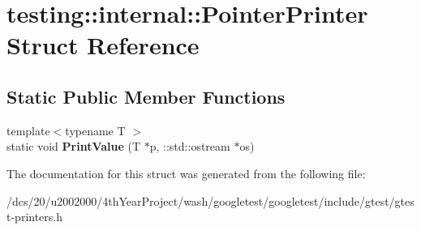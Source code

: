 \hypertarget{structtesting_1_1internal_1_1PointerPrinter}{}\section{testing\+:\+:internal\+:\+:Pointer\+Printer Struct Reference}
\label{structtesting_1_1internal_1_1PointerPrinter}
\subsection*{Static Public Member Functions}
\begin{DoxyCompactItemize}
\item 
\mbox{\label{structtesting_1_1internal_1_1PointerPrinter_a4383fca99549077ffd4e8aa7a1657fa3}} 
{\footnotesize template$<$typename T $>$ }\\static void {\bfseries Print\+Value} (T $\ast$p, \+::std\+::ostream $\ast$os)
\end{DoxyCompactItemize}


The documentation for this struct was generated from the following file\+:\begin{DoxyCompactItemize}
\item 
/dcs/20/u2002000/4th\+Year\+Project/wash/googletest/googletest/include/gtest/gtest-\/printers.\+h\end{DoxyCompactItemize}
